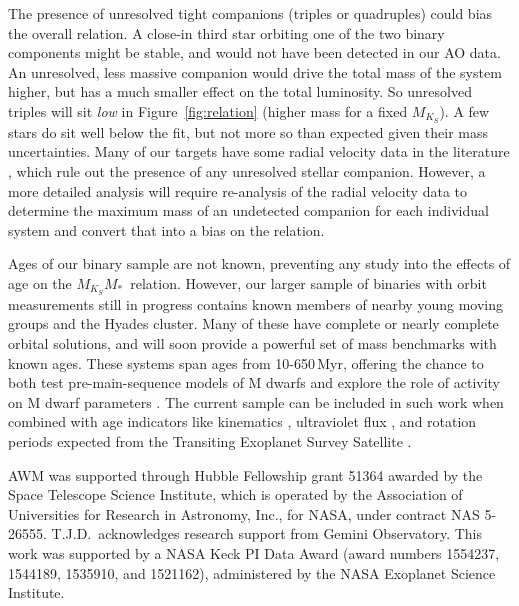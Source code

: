 \documentclass[twocolumn]{aastex62}
\newcommand{\mks}{$M_{K_S}$}
\newcommand{\mmk}{$M_{K_S}$\textendash$M_*$}
\begin{document}
The presence of unresolved tight companions (triples or quadruples) could bias the overall relation. A close-in third star orbiting one of the two binary components might be stable, and would not have been detected in our AO data. An unresolved, less massive companion would drive the total mass of the system higher, but has a much smaller effect on the total luminosity. So unresolved triples will sit {\it low} in Figure~\ref{fig:relation} (higher mass for a fixed \mks). A few stars do sit well below the fit, but not more so than expected given their mass uncertainties. Many of our targets have some radial velocity data in the literature \citep[e.g.,][]{1999A&A...344..897D,Raghavan2010,Benedict2016}, which rule out the presence of any unresolved stellar companion. However, a more detailed analysis will require re-analysis of the radial velocity data to determine the maximum mass of an undetected companion for each individual system and convert that into a bias on the relation. 

Ages of our binary sample are not known, preventing any study into the effects of age on the \mmk\ relation. However, our larger sample of binaries with orbit measurements still in progress contains known members of nearby young moving groups and the Hyades cluster. Many of these have complete or nearly complete orbital solutions, and will soon provide a powerful set of mass benchmarks with known ages. These systems span ages from 10-650\,Myr, offering the chance to both test pre-main-sequence models of M dwarfs \citep{2015ApJ...813L..11M,2016ApJ...817..164R,2016ApJ...818..156C,2016AJ....152..175N} and explore the role of activity on M dwarf parameters \citep[e.g.,][]{Spada2013,2018arXiv180404133K}. The current sample can be included in such work when combined with age indicators like kinematics \citep{2018MNRAS.tmp..966W}, ultraviolet flux \citep{Ansdell2015}, and rotation periods expected from the Transiting Exoplanet Survey Satellite \citep[{\it TESS},][]{2014SPIE.9143E..20R}. 


\acknowledgements


AWM was supported through Hubble Fellowship grant 51364 awarded by the Space Telescope Science Institute, which is operated by the Association of Universities for Research in Astronomy, Inc., for NASA, under contract NAS 5-26555. T.J.D.\ acknowledges research support from Gemini Observatory. This work was supported by a NASA Keck PI Data Award (award numbers 1554237, 1544189, 1535910, and 1521162), administered by the NASA Exoplanet Science Institute. 
\end{document}
